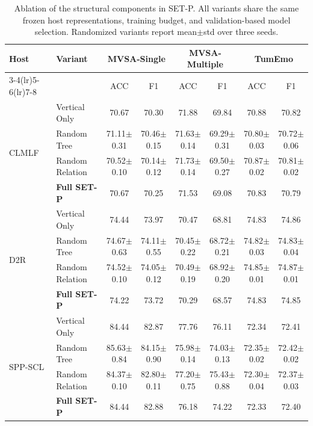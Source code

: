 \begin{table}[t]
\centering
\caption{Ablation of the structural components in SET-P. All variants share the same frozen host representations, training budget, and validation-based model selection. Randomized variants report mean$\pm$std over three seeds.}
\label{tab:structure_ablation}
\footnotesize
\renewcommand{\arraystretch}{0.95}
\setlength{\tabcolsep}{4pt}
\begin{tabular*}{\textwidth}{@{\extracolsep{\fill}}llcccccc@{}}
\toprule
\multirow{2}{*}{\textbf{Host}} & \multirow{2}{*}{\textbf{Variant}} & \multicolumn{2}{c}{\textbf{MVSA-Single}} & \multicolumn{2}{c}{\textbf{MVSA-Multiple}} & \multicolumn{2}{c}{\textbf{TumEmo}} \\
\cmidrule(lr){3-4}\cmidrule(lr){5-6}\cmidrule(lr){7-8}
& & ACC & F1 & ACC & F1 & ACC & F1 \\
\midrule
\multirow{4}{*}{CLMLF} & Vertical Only & 70.67 & 70.30 & 71.88 & 69.84 & 70.88 & 70.82 \\
 & Random Tree & 71.11$\pm$0.31 & 70.46$\pm$0.15 & 71.63$\pm$0.14 & 69.29$\pm$0.31 & 70.80$\pm$0.03 & 70.72$\pm$0.06 \\
 & Random Relation & 70.52$\pm$0.10 & 70.14$\pm$0.12 & 71.73$\pm$0.14 & 69.50$\pm$0.27 & 70.87$\pm$0.02 & 70.81$\pm$0.02 \\
 & \textbf{Full SET-P} & 70.67 & 70.25 & 71.53 & 69.08 & 70.83 & 70.79 \\
\midrule
\multirow{4}{*}{D2R} & Vertical Only & 74.44 & 73.97 & 70.47 & 68.81 & 74.83 & 74.86 \\
 & Random Tree & 74.67$\pm$0.63 & 74.11$\pm$0.55 & 70.45$\pm$0.22 & 68.72$\pm$0.21 & 74.82$\pm$0.03 & 74.83$\pm$0.04 \\
 & Random Relation & 74.52$\pm$0.10 & 74.05$\pm$0.12 & 70.49$\pm$0.19 & 68.92$\pm$0.20 & 74.85$\pm$0.01 & 74.87$\pm$0.01 \\
 & \textbf{Full SET-P} & 74.22 & 73.72 & 70.29 & 68.57 & 74.83 & 74.85 \\
\midrule
\multirow{4}{*}{SPP-SCL} & Vertical Only & 84.44 & 82.87 & 77.76 & 76.11 & 72.34 & 72.41 \\
 & Random Tree & 85.63$\pm$0.84 & 84.15$\pm$0.90 & 75.98$\pm$0.14 & 74.03$\pm$0.13 & 72.35$\pm$0.02 & 72.42$\pm$0.02 \\
 & Random Relation & 84.37$\pm$0.10 & 82.80$\pm$0.11 & 77.20$\pm$0.75 & 75.43$\pm$0.88 & 72.30$\pm$0.04 & 72.37$\pm$0.03 \\
 & \textbf{Full SET-P} & 84.44 & 82.88 & 76.18 & 74.22 & 72.33 & 72.40 \\
\bottomrule
\end{tabular*}
\end{table}
